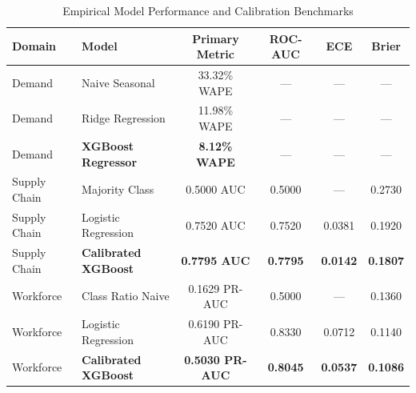 \begin{table}[htbp]
\caption{Empirical Model Performance and Calibration Benchmarks}
\begin{center}
\begin{tabular}{llcccc}
\toprule
\textbf{Domain} & \textbf{Model} & \textbf{Primary Metric} & \textbf{ROC-AUC} & \textbf{ECE} & \textbf{Brier} \\
\midrule
Demand & Naive Seasonal & 33.32\% WAPE & --- & --- & --- \\
Demand & Ridge Regression & 11.98\% WAPE & --- & --- & --- \\
Demand & \textbf{XGBoost Regressor} & \textbf{8.12\% WAPE} & --- & --- & --- \\
\midrule
Supply Chain & Majority Class & 0.5000 AUC & 0.5000 & --- & 0.2730 \\
Supply Chain & Logistic Regression & 0.7520 AUC & 0.7520 & 0.0381 & 0.1920 \\
Supply Chain & \textbf{Calibrated XGBoost} & \textbf{0.7795 AUC} & \textbf{0.7795} & \textbf{0.0142} & \textbf{0.1807} \\
\midrule
Workforce & Class Ratio Naive & 0.1629 PR-AUC & 0.5000 & --- & 0.1360 \\
Workforce & Logistic Regression & 0.6190 PR-AUC & 0.8330 & 0.0712 & 0.1140 \\
Workforce & \textbf{Calibrated XGBoost} & \textbf{0.5030 PR-AUC} & \textbf{0.8045} & \textbf{0.0537} & \textbf{0.1086} \\
\bottomrule
\end{tabular}
\label{tab:model_performance}
\end{center}
\end{table}
